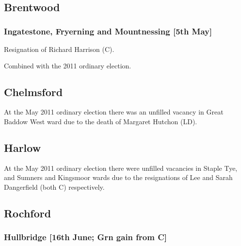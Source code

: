 \begin{resultsiii}
\subsection*{Brentwood}

\subsubsection*{Ingatestone, Fryerning and Mountnessing \hspace*{\fill}\nolinebreak[1]%
\enspace\hspace*{\fill}
[5th May]}


Resignation of Richard Harrison (C).

Combined with the 2011 ordinary election.

\subsection*{Chelmsford}


At the May 2011 ordinary election there was an unfilled vacancy in Great Baddow West ward due to the death of Margaret Hutchon (LD).

\subsection*{Harlow}



At the May 2011 ordinary election there were unfilled vacancies in Staple Tye, and Sumners and Kingsmoor wards due to the resignations of Lee and Sarah Dangerfield (both C) respectively.

\subsection*{Rochford}

\subsubsection*{Hullbridge \hspace*{\fill}\nolinebreak[1]%
\enspace\hspace*{\fill}
[16th June; Grn gain from C]}


\end{resultsiii}
